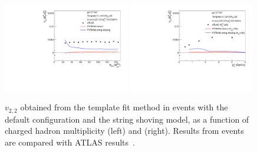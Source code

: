 \begin{figure}[!h]
\includegraphics[width=0.49\textwidth]{figures/atlasmult.pdf}
\includegraphics[width=0.49\textwidth]{figures/atlaspt.pdf}
\caption{$v_{2,2}$ obtained from the template fit method in \pythia events with the default configuration and the string shoving model, as a function of charged hadron multiplicity (left) and \pt (right). Results from \pythia events are compared with ATLAS results~\cite{Aad:2015gqa}.}
\label{fig:v22}
\end{figure}


